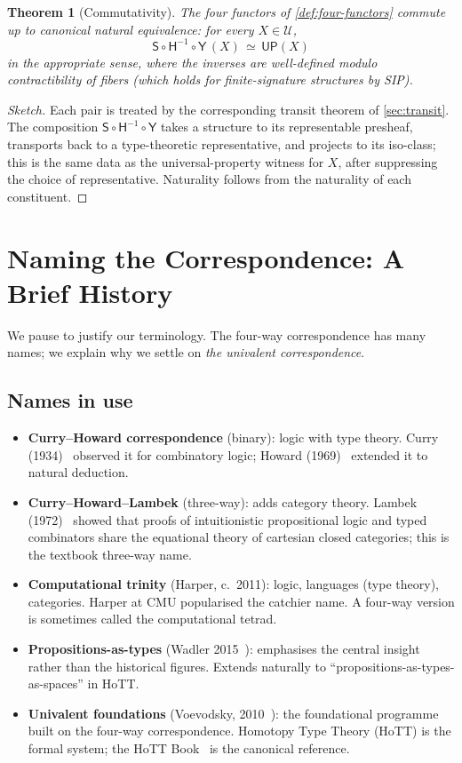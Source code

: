 \documentclass[12pt]{article}
\newtheorem{theorem}{Theorem}[section]
\theoremstyle{definition}
\theoremstyle{remark}
\newcommand{\U}{\mathcal{U}}
\newcommand{\eqv}{\simeq}
\begin{document}
\begin{theorem}[Commutativity]
\label{thm:commutativity}
The four functors of \cref{def:four-functors} commute up to canonical
natural equivalence: for every $X \in \U$,
\[
\mathsf{S} \circ \mathsf{H}^{-1} \circ \mathsf{Y}\,(X) \,\eqv\, \mathsf{UP}(X)
\]
in the appropriate sense, where the inverses are well-defined modulo
contractibility of fibers (which holds for finite-signature structures by
SIP).
\end{theorem}

\begin{proof}[Sketch]
Each pair is treated by the corresponding transit theorem of
\cref{sec:transit}. The composition $\mathsf{S} \circ \mathsf{H}^{-1} \circ \mathsf{Y}$
takes a structure to its representable presheaf, transports back to a
type-theoretic representative, and projects to its iso-class; this is the
same data as the universal-property witness for $X$, after suppressing the
choice of representative. Naturality follows from the naturality of each
constituent.
\end{proof}

\section{Naming the Correspondence: A Brief History}
\label{sec:naming}

We pause to justify our terminology. The four-way correspondence has many
names; we explain why we settle on \emph{the univalent correspondence}.

\subsection{Names in use}

\begin{itemize}
\item \textbf{Curry--Howard correspondence} (binary): logic with type
theory. Curry (1934)~\cite{wadler-pat} observed it for combinatory logic;
Howard (1969)~\cite{wadler-pat} extended it to natural deduction.
\item \textbf{Curry--Howard--Lambek} (three-way): adds category theory.
Lambek (1972)~\cite{Lambek1972} showed that proofs of intuitionistic
propositional logic and typed combinators share the equational theory of
cartesian closed categories; this is the textbook three-way name.
\item \textbf{Computational trinity} (Harper, c.\ 2011): logic, languages
(type theory), categories. Harper at CMU popularised the catchier name. A
four-way version is sometimes called the computational tetrad.
\item \textbf{Propositions-as-types} (Wadler 2015~\cite{Wadler2015}):
emphasises the central insight rather than the historical figures.
Extends naturally to ``propositions-as-types-as-spaces'' in HoTT.
\item \textbf{Univalent foundations} (Voevodsky, 2010~\cite{Voevodsky2010}):
the foundational programme built on the four-way correspondence. Homotopy
Type Theory (HoTT) is the formal system; the
HoTT Book~\cite{HoTTBook} is the canonical reference.
\end{itemize}
\end{document}
